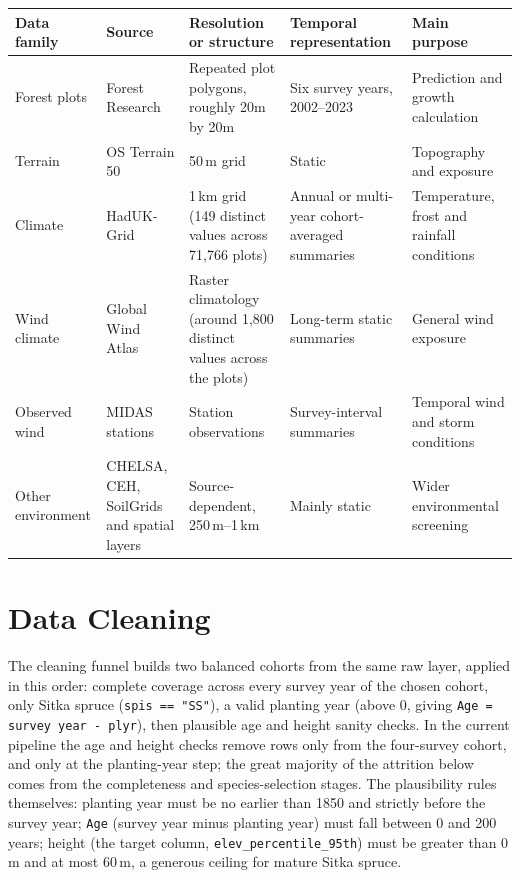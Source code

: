 \documentclass[11pt,a4paper]{report}
\begin{document}
\begin{table}[h]
\centering
\begin{tabular}{p{2.2cm}p{3cm}p{3cm}p{3cm}p{3.5cm}}
\hline
Data family & Source & Resolution or structure & Temporal representation & Main purpose \\
\hline
Forest plots & Forest Research & Repeated plot polygons, roughly 20m by 20m & Six survey years, 2002--2023 & Prediction and growth calculation \\
Terrain & OS Terrain 50 & 50\,m grid & Static & Topography and exposure \\
Climate & HadUK-Grid & 1\,km grid (149 distinct values across 71,766 plots) & Annual or multi-year cohort-averaged summaries & Temperature, frost and rainfall conditions \\
Wind climate & Global Wind Atlas & Raster climatology (around 1,800 distinct values across the plots) & Long-term static summaries & General wind exposure \\
Observed wind & MIDAS stations & Station observations & Survey-interval summaries & Temporal wind and storm conditions \\
Other environment & CHELSA, CEH, SoilGrids and spatial layers & Source-dependent, 250\,m--1\,km & Mainly static & Wider environmental screening \\
\hline
\end{tabular}
\end{table}

\section{Data Cleaning}
The cleaning funnel builds two balanced cohorts from the same raw layer, applied in this order: complete coverage across every survey year of the chosen cohort, only Sitka spruce (\texttt{spis == "SS"}), a valid planting year (above 0, giving \texttt{Age = survey year - plyr}), then plausible age and height sanity checks.
In the current pipeline the age and height checks remove rows only from the four-survey cohort, and only at the planting-year step; the great majority of the attrition below comes from the completeness and species-selection stages.
The plausibility rules themselves: planting year must be no earlier than 1850 and strictly before the survey year; \texttt{Age} (survey year minus planting year) must fall between 0 and 200 years; height (the target column, \texttt{elev\_percentile\_95th}) must be greater than 0\,m and at most 60\,m, a generous ceiling for mature Sitka spruce.
\end{document}
